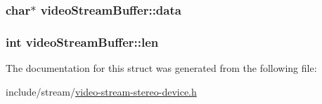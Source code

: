 \subsubsection[{\texorpdfstring{data}{data}}]{\setlength{\rightskip}{0pt plus 5cm}char$\ast$ video\+Stream\+Buffer\+::data}\hypertarget{structvideoStreamBuffer_a2854e01e5c157423b0b8e84f3b264daa}{}\label{structvideoStreamBuffer_a2854e01e5c157423b0b8e84f3b264daa}
\subsubsection[{\texorpdfstring{len}{len}}]{\setlength{\rightskip}{0pt plus 5cm}int video\+Stream\+Buffer\+::len}\hypertarget{structvideoStreamBuffer_a9c5bdf26c0bea4bb642eab19ef08213f}{}\label{structvideoStreamBuffer_a9c5bdf26c0bea4bb642eab19ef08213f}


The documentation for this struct was generated from the following file\+:\begin{DoxyCompactItemize}
\item 
include/stream/\hyperlink{video-stream-stereo-device_8h}{video-\/stream-\/stereo-\/device.\+h}\end{DoxyCompactItemize}
